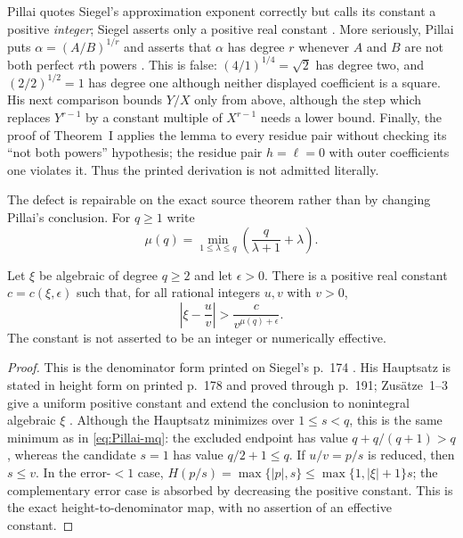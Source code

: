 \begin{sourceissue}
\label{sourceissue:Pillai-degree-gap}
Pillai quotes Siegel's approximation exponent correctly but calls its
constant a positive \emph{integer}; Siegel asserts only a positive real
constant \cite[p.~174]{Siegel1921}.  More seriously, Pillai puts
$\alpha=(A/B)^{1/r}$ and asserts that $\alpha$ has degree $r$ whenever $A$
and $B$ are not both perfect $r$th powers \cite[p.~3]{Pillai1931}.  This is
false: $(4/1)^{1/4}=\sqrt2$ has degree two, and
$(2/2)^{1/2}=1$ has degree one although neither displayed coefficient is a
square.  His next comparison bounds $Y/X$ only from above, although the step
which replaces $Y^{r-1}$ by a constant multiple of $X^{r-1}$ needs a lower
bound.  Finally, the proof of Theorem~I applies the lemma to every residue
pair without checking its ``not both powers'' hypothesis; the residue pair
$h=\ell=0$ with outer coefficients one violates it.  Thus the printed
derivation is not admitted literally.
\end{sourceissue}

The defect is repairable on the exact source theorem rather than by changing
Pillai's conclusion.  For $q\geq1$ write
\begin{equation}
\label{eq:Pillai-mq}
 \mu(q)=\min_{1\leq\lambda\leq q}
 \left(\frac{q}{\lambda+1}+\lambda\right).
\end{equation}

\begin{theorem}
\label{thm:Siegel-rational-approximation}
Let $\xi$ be algebraic of degree $q\geq2$ and let $\epsilon>0$.
There is a positive real constant $c=c(\xi,\epsilon)$ such that, for all
rational integers $u,v$ with $v>0$,
\[
 \left|\xi-\frac uv\right|
 >\frac{c}{v^{\mu(q)+\epsilon}}.
\]
The constant is not asserted to be an integer or numerically effective.
\end{theorem}

\begin{proof}
This is the denominator form printed on Siegel's p.~174
\cite[p.~174]{Siegel1921}.  His Hauptsatz is stated in height form on
printed p.~178 and proved through p.~191; Zus\"atze~1--3 give a uniform
positive constant and extend the conclusion to nonintegral algebraic
$\xi$ \cite[pp.~178, 191]{Siegel1921}.  Although the Hauptsatz minimizes over
$1\leq s<q$, this is the same minimum as in \eqref{eq:Pillai-mq}: the
excluded endpoint has value $q+q/(q+1)>q$, whereas the candidate $s=1$ has
value $q/2+1\leq q$.  If $u/v=p/s$ is reduced, then
$s\leq v$.  In the error-$<1$ case,
$H(p/s)=\max\{|p|,s\}\leq\max\{1,|\xi|+1\}s$; the complementary error
case is absorbed by decreasing the positive constant.  This is the exact
height-to-denominator map, with no assertion of an effective constant.
\end{proof}

